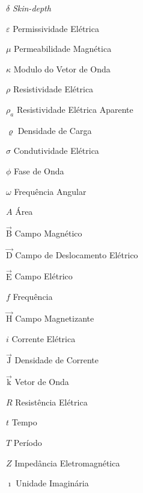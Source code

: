 \documentclass[12pt,twoside,oneright,a4paper,chapter=TITLE,english,brazil]{unipampa}
\newcommand{\en}[1]{\textit{#1}}
\newcommand{\vetor}[1]{\vec{\textrm{#1}}}
\begin{document}
\begin{simbolos}
    \begin{multicols}{2}
    \item[$\delta$]                 \en{Skin-depth}
    \item[$\varepsilon$]             Permissividade Elétrica
    \item[$\mu$]                     Permeabilidade Magnética
    \item[$\kappa$]                  Modulo do Vetor de Onda
    \item[$\rho$]                    Resistividade Elétrica
    \item[$\rho_a$]                  Resistividade Elétrica Aparente
    \item[$\varrho$]                 Densidade de Carga
    \item[$\sigma$]                  Condutividade Elétrica
    \item[$\phi$]                    Fase de Onda
    \item[$\omega$]                  Frequência Angular
    \item[$A$]                       Área
    \item[$\vetor{B}$]               Campo Magnético
    \item[$\vetor{D}$]               Campo de Deslocamento Elétrico
    \item[$\vetor{E}$]               Campo Elétrico
    \item[$f$]                       Frequência
    \item[$\vetor{H}$]               Campo Magnetizante
    \item[$i$]                       Corrente Elétrica
    \item[$\vetor{J}$]               Densidade de Corrente
    \item[$\vetor{k}$]               Vetor de Onda
    \item[$R$]                       Resistência Elétrica
    \item[$t$]                       Tempo
    \item[$T$]                       Período
    \item[$Z$]                       Impedância Eletromagnética  
    \item[$\imath$]                  Unidade Imaginária

\end{multicols}
\end{simbolos}
\end{document}
